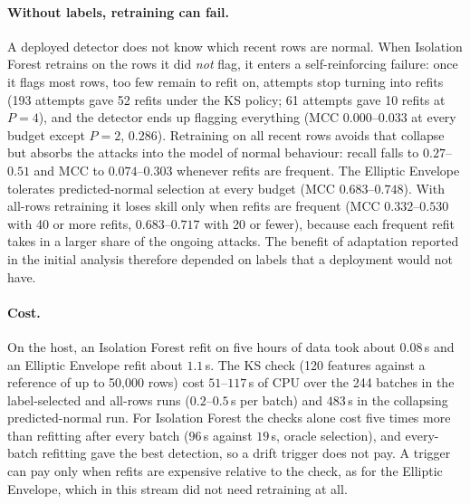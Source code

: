 \documentclass[11pt]{article}
\begin{document}
\paragraph{Without labels, retraining can fail.} A deployed detector does not know
which recent rows are normal. When Isolation Forest retrains on the rows it did
\emph{not} flag, it enters a self-reinforcing failure: once it flags most rows, too few
remain to refit on, attempts stop turning into refits (193 attempts gave 52 refits
under the KS policy; 61 attempts gave 10 refits at $P{=}4$), and the detector ends up
flagging everything (MCC $0.000$--$0.033$ at every budget except $P{=}2$, $0.286$).
Retraining on all recent rows avoids that collapse but absorbs the attacks into the
model of normal behaviour: recall falls to $0.27$--$0.51$ and MCC to $0.074$--$0.303$
whenever refits are frequent. The Elliptic Envelope tolerates predicted-normal selection
at every budget (MCC $0.683$--$0.748$). With all-rows retraining it loses skill only when
refits are frequent (MCC $0.332$--$0.530$ with 40 or more refits, $0.683$--$0.717$ with
20 or fewer), because each frequent refit takes in a larger share of the ongoing attacks.
The benefit of adaptation reported in the initial analysis therefore depended on labels
that a deployment would not have.

\paragraph{Cost.} On the host, an Isolation Forest refit on five hours of data took
about $0.08$\,s and an Elliptic Envelope refit about $1.1$\,s. The KS check (120
features against a reference of up to 50{,}000 rows) cost $51$--$117$\,s of CPU over the
244 batches in the label-selected and all-rows runs ($0.2$--$0.5$\,s per batch) and
$483$\,s in the collapsing predicted-normal run. For Isolation Forest the checks alone
cost five times more than refitting after every batch ($96$\,s against $19$\,s, oracle
selection), and every-batch refitting gave the best detection, so a drift trigger does not
pay. A trigger can pay only when refits are expensive relative to the check, as for the
Elliptic Envelope, which in this stream did not need retraining at all.
\end{document}
